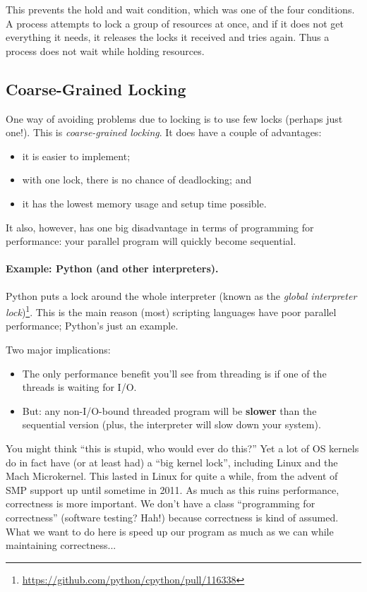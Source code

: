 This prevents the hold and wait condition, which was one of the four conditions. A process attempts to lock a group of resources at once, and if it does not get everything it needs, it releases the locks it received and tries again. Thus a process does not wait while holding resources.

\subsection*{Coarse-Grained Locking}
One way of avoiding problems due to locking is to use few locks
(perhaps just one!). This is \emph{coarse-grained locking}.
It does have a couple of advantages: \\ \vspace*{-3em}
  \begin{itemize}[noitemsep]
    \item it is easier to implement;
    \item with one lock, there is no chance of deadlocking; and
    \item it has the lowest memory usage and setup time possible.
  \end{itemize}

It also, however, has one big disadvantage in terms of programming for performance: your parallel program will quickly become sequential.

\paragraph{Example: Python (and other interpreters).}
Python puts a lock around the whole interpreter (known as the
\emph{global interpreter lock})\footnote{\url{https://github.com/python/cpython/pull/116338}}. This is the main reason (most)
scripting languages have poor parallel performance; Python's just an
example.

Two major implications:\\ \vspace*{-3em}
\begin{itemize}[noitemsep]
\item The only performance benefit you'll see from threading is if one of the threads is
      waiting for I/O.
\item But: any non-I/O-bound threaded program will be {\bf slower} than the sequential
      version (plus, the interpreter will slow down your system).
\end{itemize}

You might think ``this is stupid, who would ever do this?'' Yet a lot of OS kernels do in fact have (or at least had) a ``big kernel lock'', including Linux and the Mach Microkernel. This lasted in Linux for quite a while, from the advent of SMP support up until sometime in 2011. As much as this ruins performance, correctness is more important. We don't have a class ``programming for correctness'' (software testing? Hah!) because correctness is kind of assumed. What we want to do here is speed up our program as much as we can while maintaining correctness...

